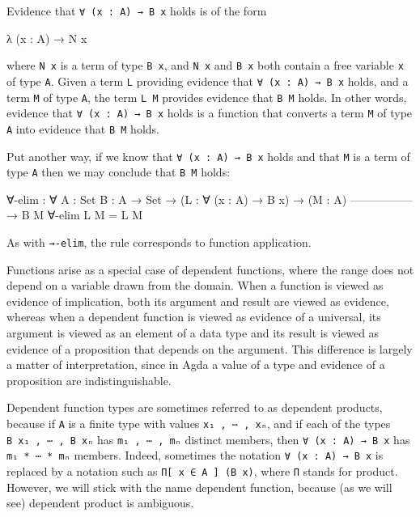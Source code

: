 Evidence that \texttt{∀\ (x\ :\ A)\ →\ B\ x} holds is of the form

\begin{myDisplay}
λ (x : A) → N x
\end{myDisplay}

where \texttt{N\ x} is a term of type \texttt{B\ x}, and \texttt{N\ x}
and \texttt{B\ x} both contain a free variable \texttt{x} of type
\texttt{A}. Given a term \texttt{L} providing evidence that
\texttt{∀\ (x\ :\ A)\ →\ B\ x} holds, and a term \texttt{M} of type
\texttt{A}, the term \texttt{L\ M} provides evidence that \texttt{B\ M}
holds. In other words, evidence that \texttt{∀\ (x\ :\ A)\ →\ B\ x}
holds is a function that converts a term \texttt{M} of type \texttt{A}
into evidence that \texttt{B\ M} holds.

Put another way, if we know that \texttt{∀\ (x\ :\ A)\ →\ B\ x} holds
and that \texttt{M} is a term of type \texttt{A} then we may conclude
that \texttt{B\ M} holds:

\begin{fence}
\begin{code}
∀-elim : ∀ {A : Set} {B : A → Set}
  → (L : ∀ (x : A) → B x)
  → (M : A)
    -----------------
  → B M
∀-elim L M = L M
\end{code}
\end{fence}

As with \texttt{→-elim}, the rule corresponds to function application.

Functions arise as a special case of dependent functions, where the
range does not depend on a variable drawn from the domain. When a
function is viewed as evidence of implication, both its argument and
result are viewed as evidence, whereas when a dependent function is
viewed as evidence of a universal, its argument is viewed as an element
of a data type and its result is viewed as evidence of a proposition
that depends on the argument. This difference is largely a matter of
interpretation, since in Agda a value of a type and evidence of a
proposition are indistinguishable.

Dependent function types are sometimes referred to as dependent
products, because if \texttt{A} is a finite type with values
\texttt{x₁\ ,\ ⋯\ ,\ xₙ}, and if each of the types
\texttt{B\ x₁\ ,\ ⋯\ ,\ B\ xₙ} has \texttt{m₁\ ,\ ⋯\ ,\ mₙ} distinct
members, then \texttt{∀\ (x\ :\ A)\ →\ B\ x} has
\texttt{m₁\ *\ ⋯\ *\ mₙ} members. Indeed, sometimes the notation
\texttt{∀\ (x\ :\ A)\ →\ B\ x} is replaced by a notation such as
\texttt{Π{[}\ x\ ∈\ A\ {]}\ (B\ x)}, where \texttt{Π} stands for
product. However, we will stick with the name dependent function,
because (as we will see) dependent product is ambiguous.

